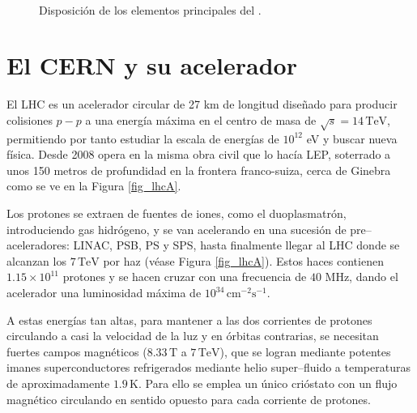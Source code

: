 \vspace*{\fill}

\begin{figure}[H]
\centering
{} \\ \vfill
{} \vfill
\caption{Disposición de los elementos principales del \lhc.} \label{fig_lhc}
\end{figure}

\vspace*{\fill}

\newpage


\section{El CERN y su acelerador \lhc} %


El LHC es un acelerador circular de 27 km de longitud diseñado para producir colisiones $p-p$ a una energía máxima en el centro de masa de $\sqrt{s} = 14 \, \mathrm{TeV}$, permitiendo por tanto estudiar la escala de energías de $10^{12}$ eV y buscar nueva física. \color{vero} Desde 2008 opera en la misma obra civil que lo hacía LEP, \color{norm} soterrado a unos 150 metros de profundidad en la frontera franco-suiza, cerca de Ginebra como se ve en la Figura \ref{fig_lhcA}.

Los protones se extraen de fuentes de iones, como el duoplasmatrón, introduciendo gas hidrógeno,
y se van acelerando en una sucesión de  pre--aceleradores: LINAC, PSB, PS y  SPS, hasta finalmente llegar al LHC donde se alcanzan los $7 \, \mathrm{TeV}$ por haz (véase Figura \ref{fig_lhcA}).
%
Estos haces contienen $1.15 \times  10^{11}$ protones y se hacen cruzar con una frecuencia de $40$ MHz, dando el acelerador una luminosidad máxima de $10^{34} \, \mathrm{cm^{-2}s^{-1}}$.


A estas energías tan altas, para mantener a las dos corrientes de protones circulando a casi la velocidad de la luz y en órbitas contrarias, se necesitan fuertes campos magnéticos ($8.33 \, \mathrm{T}$ a $7 \, \mathrm{TeV}$), que se logran mediante potentes imanes superconductores refrigerados mediante helio super--fluido a  temperaturas de aproximadamente $1.9 \, \text{K}$. Para ello se  emplea un único crióstato con un flujo magnético circulando en sentido opuesto para cada corriente de protones.
 






